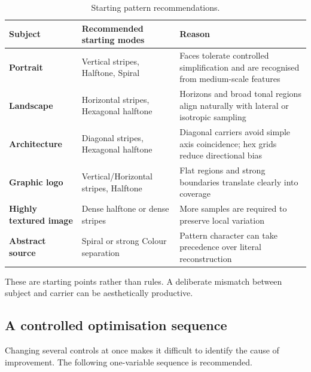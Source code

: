\begin{table}[H]
\centering
\caption{Starting pattern recommendations.}
\begin{tabularx}{\textwidth}{>{\bfseries}l >{\raggedright\arraybackslash}X >{\raggedright\arraybackslash}X}
\toprule
Subject & Recommended starting modes & Reason \\
\midrule
Portrait & Vertical stripes, Halftone, Spiral & Faces tolerate controlled simplification and are recognised from medium-scale features \\
Landscape & Horizontal stripes, Hexagonal halftone & Horizons and broad tonal regions align naturally with lateral or isotropic sampling \\
Architecture & Diagonal stripes, Hexagonal halftone & Diagonal carriers avoid simple axis coincidence; hex grids reduce directional bias \\
Graphic logo & Vertical/Horizontal stripes, Halftone & Flat regions and strong boundaries translate clearly into coverage \\
Highly textured image & Dense halftone or dense stripes & More samples are required to preserve local variation \\
Abstract source & Spiral or strong Colour separation & Pattern character can take precedence over literal reconstruction \\
\bottomrule
\end{tabularx}
\end{table}

These are starting points rather than rules. A deliberate mismatch between subject and carrier can be aesthetically productive.

\subsection{A controlled optimisation sequence}

Changing several controls at once makes it difficult to identify the cause of improvement. The following one-variable sequence is recommended.

